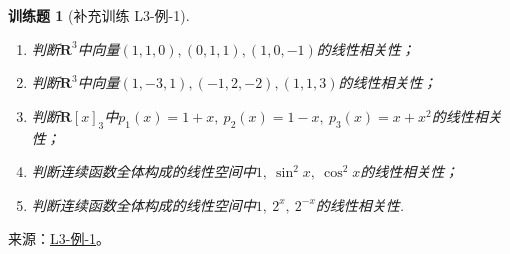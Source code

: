 \documentclass[UTF8,12pt,a4paper,fontset=fandol]{ctexart}
\newtheorem{exercise}{训练题}[section]
\begin{document}
\begin{exercise}[补充训练 L3-例-1]\label{prob:L3-例-1}
\begin{enumerate}[label=(\arabic*)]
        \item 判断$\mathbf{R}^3$中向量$(1,1,0),(0,1,1),(1,0,-1)$的线性相关性；

        \item 判断$\mathbf{R}^3$中向量$(1,-3,1),(-1,2,-2),(1,1,3)$的线性相关性；

        \item \label{item:3:线性相关性:3}
              判断$\mathbf{R}[x]_3$中$p_1(x)=1+x,\ p_2(x)=1-x,\ p_3(x)=x+x^2$的线性相关性；

        \item 判断连续函数全体构成的线性空间中$1,\ \sin^2x,\ \cos^2x$的线性相关性；

        \item \label{item:3:线性相关性:5}
              判断连续函数全体构成的线性空间中$1,\ 2^x,\ 2^{-x}$的线性相关性.
    \end{enumerate}
\end{exercise}
\noindent 来源：\href{https://github.com/yhwu-is/Linear-Algebra-Left-Undone/blob/new/%E8%AE%B2%E4%B9%89/%E4%B8%93%E9%A2%98/3%20%E6%9C%89%E9%99%90%E7%BB%B4%E7%BA%BF%E6%80%A7%E7%A9%BA%E9%97%B4.tex}{L3-例-1}。
\end{document}
